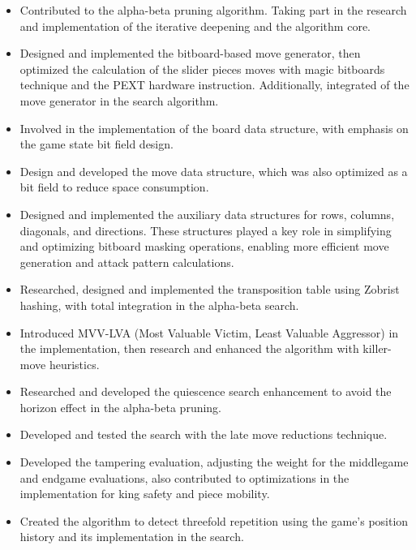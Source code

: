\begin{itemize}[itemsep=1pt]

    \item Contributed to the alpha-beta pruning algorithm. Taking part in the research and implementation of the iterative deepening and the algorithm core.

    \item Designed and implemented the bitboard-based move generator, then optimized the calculation of the slider pieces moves with magic bitboards technique and the PEXT hardware instruction. Additionally, integrated of the move generator in the search algorithm.

    \item Involved in the implementation of the board data structure, with emphasis on the game state bit field design.

    \item Design and developed the move data structure, which was also optimized as a bit field to reduce space consumption.    

    \item Designed and implemented the auxiliary data structures for rows, columns, diagonals, and directions. These structures played a key role in simplifying and optimizing bitboard masking operations, enabling more efficient move generation and attack pattern calculations.
    
    \item Researched, designed and implemented the transposition table using Zobrist hashing, with total integration in the alpha-beta search.

    \item Introduced MVV-LVA (Most Valuable Victim, Least Valuable Aggressor) in the implementation, then research and enhanced the algorithm with killer-move heuristics.

    \item Researched and developed the quiescence search enhancement to avoid the horizon effect in the alpha-beta pruning.

    \item Developed and tested the search with the late move reductions technique.

    \item Developed the tampering evaluation, adjusting the weight for the middlegame and endgame evaluations, also contributed to optimizations in the implementation for king safety and piece mobility.

    \item Created the algorithm to detect threefold repetition using the game's position history and its implementation in the search.


\end{itemize}
